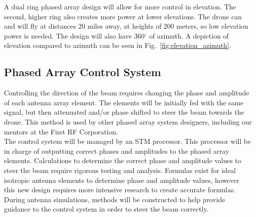 \documentclass[UROP.tex]{subfiles}
\begin{document}
	A dual ring phased array design will allow for more control in elevation.  The second, higher ring also creates more power at lower elevations.  The drone can and will fly at distances 20 miles away, at heights of 200 meters, so low elevation power is needed.  The design will also have 360$^{\circ}$ of azimuth.  A depiction of elevation compared to azimuth can be seen in Fig.~\ref{fig:elevation_azimuth}. \\
	
\subsection{Phased Array Control System}

	Controlling the direction of the beam requires changing the phase and amplitude of each antenna array element.  The elements will be initially fed with the same signal, but then attenuated and/or phase shifted to steer the beam towards the drone.  This method is used by other phased array system designers, including our mentors at the First RF Corporation.  \\
	
	The control system will be managed by an STM processor.  This processor will be in charge of outputting correct phases and amplitudes to the phased array elements.  Calculations to determine the correct phase and amplitude values to steer the beam require rigorous testing and analysis.  Formulas exist for ideal isotropic antenna elements to determine phase and amplitude values, however this new design requires more intensive research to create accurate formulas.  During antenna simulations, methods will be constructed to help provide guidance to the control system in order to steer the beam correctly. \\
	
\end{document}
